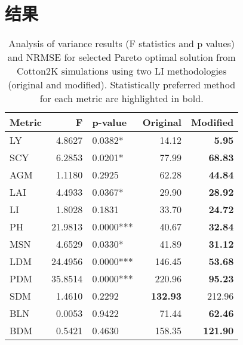 \chapter{结果}

\begin{table}
    \label{tab:stats}
    \caption{Analysis of variance results (F statistics and p values) and NRMSE for selected Pareto optimal solution from Cotton2K
        simulations using two LI methodologies (original and modified). Statistically preferred method for each metric are highlighted
        in bold.}
    \begin{tabular}{lrlrr}
        \toprule
        Metric & F       & p-value   & Original        & Modified        \\
        \midrule
        LY     & 4.8627  & 0.0382*   & 14.12           & \textbf{5.95}   \\
        SCY    & 6.2853  & 0.0201*   & 77.99           & \textbf{68.83}  \\
        AGM    & 1.1180  & 0.2925    & 62.28           & \textbf{44.84}  \\
        LAI    & 4.4933  & 0.0367*   & 29.90           & \textbf{28.92}  \\
        LI     & 1.8028  & 0.1831    & 33.70           & \textbf{24.72}  \\
        PH     & 21.9813 & 0.0000*** & 40.67           & \textbf{32.84}  \\
        MSN    & 4.6529  & 0.0330*   & 41.89           & \textbf{31.12}  \\
        LDM    & 24.4956 & 0.0000*** & 146.45          & \textbf{53.68}  \\
        PDM    & 35.8514 & 0.0000*** & 220.96          & \textbf{95.23}  \\
        SDM    & 1.4610  & 0.2292    & \textbf{132.93} & 212.96          \\
        BLN    & 0.0053  & 0.9422    & 71.44           & \textbf{62.46}  \\
        BDM    & 0.5421  & 0.4630    & 158.35          & \textbf{121.90} \\
        \bottomrule
    \end{tabular}
\end{table}
